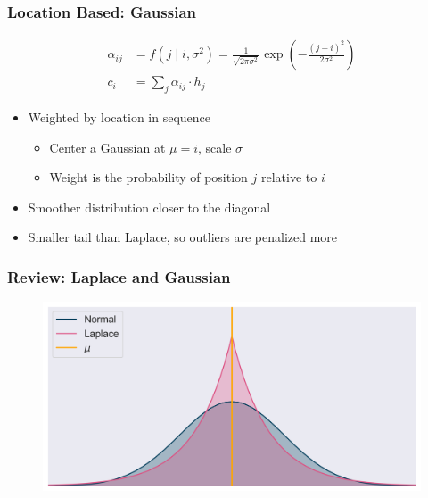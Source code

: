 \documentclass[usenames,dvipsnames]{beamer}
\begin{document}
\begin{frame}
\frametitle{Location Based: Gaussian}
\begin{equation*}
  \begin{split}
  \alpha_{ij} &= f \left(j \mid i, \sigma^2 \right) = \frac{1}{\sqrt{2\pi\sigma^2}} \exp \left( - \frac{\left( j - i \right)^2}{2\sigma^2} \right) \\
  c_i &= \sum_{j} \alpha_{ij} \cdot h_j
  \end{split}
\end{equation*}
\begin{itemize}
  \item Weighted by location in sequence
  \begin{itemize}
    \item Center a Gaussian at $\mu=i$, scale $\sigma$
    \item Weight is the probability of position $j$ relative to $i$
  \end{itemize}
  \item Smoother distribution closer to the diagonal
  \item Smaller tail than Laplace, so outliers are penalized more
\end{itemize}
\end{frame}

\begin{frame}
  \frametitle{Review: Laplace and Gaussian}
  \begin{figure}
    \includegraphics[width=\textwidth]{assets/dist}
  \end{figure}
\end{frame}
\end{document}
